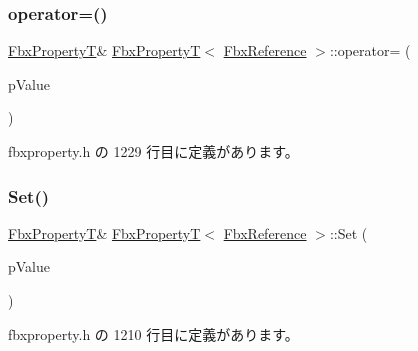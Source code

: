\subsubsection{\texorpdfstring{operator=()}{operator=()}}
{\footnotesize\ttfamily \hyperlink{class_fbx_property_t}{Fbx\+PropertyT}\& \hyperlink{class_fbx_property_t}{Fbx\+PropertyT}$<$ \hyperlink{fbxtypes_8h_a44df6a2eec915cf27cd481e5c5e48a24}{Fbx\+Reference} $>$\+::operator= (\begin{DoxyParamCaption}\item[{const \hyperlink{fbxtypes_8h_a44df6a2eec915cf27cd481e5c5e48a24}{Fbx\+Reference} \&}]{p\+Value }\end{DoxyParamCaption})\hspace{0.3cm}{\ttfamily [inline]}}



 fbxproperty.\+h の 1229 行目に定義があります。

\mbox{\label{class_fbx_property_t_3_01_fbx_reference_01_4_a7d67d93829ab10066d0f7814a676f3c3}} 
\subsubsection{\texorpdfstring{Set()}{Set()}}
{\footnotesize\ttfamily \hyperlink{class_fbx_property_t}{Fbx\+PropertyT}\& \hyperlink{class_fbx_property_t}{Fbx\+PropertyT}$<$ \hyperlink{fbxtypes_8h_a44df6a2eec915cf27cd481e5c5e48a24}{Fbx\+Reference} $>$\+::Set (\begin{DoxyParamCaption}\item[{const \hyperlink{fbxtypes_8h_a44df6a2eec915cf27cd481e5c5e48a24}{Fbx\+Reference} \&}]{p\+Value }\end{DoxyParamCaption})\hspace{0.3cm}{\ttfamily [inline]}}



 fbxproperty.\+h の 1210 行目に定義があります。

\mbox{\label{class_fbx_property_t_3_01_fbx_reference_01_4_ae40af651436b9b3df5bbb049e512421d}} 
